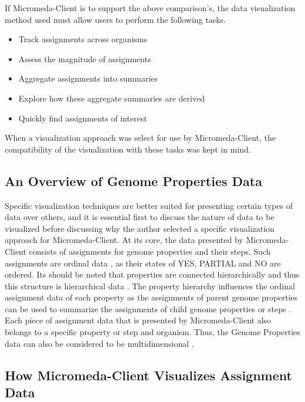 If Micromeda-Client is to support the above comparison's, the data visualization method used must allow users to perform the following tasks.

\begin{itemize}
\item Track assignments across organisms
\item Assess the magnitude of assignments
\item Aggregate assignments into summaries
\item Explore how these aggregate summaries are derived
\item Quickly find assignments of interest
\end{itemize}

When a visualization approach was select for use by Micromeda-Client, the compatibility of the visualization with these tasks was kept in mind.

\subsection{An Overview of Genome Properties Data}

Specific visualization techniques are better suited for presenting certain types of data over others, and it is essential first to discuss the nature of data to be visualized before discussing why the author selected a specific visualization approach for Micromeda-Client. At its core, the data presented by Micromeda-Client consists of assignments for genome properties and their steps. Such assignments are ordinal data \cite{richardson2018genome,agresti2010analysis}, as their states of YES, PARTIAL and NO are ordered. Its should be noted that properties are connected hierarchically \cite{richardson2018genome} and thus this structure is hierarchical data \cite{richardson2018genome,samet1990applications}. The property hierarchy influences the ordinal assignment data of each property as the assignments of parent genome properties can be used to summarize the assignments of child genome properties or steps \cite{richardson2018genome}. Each piece of assignment data that is presented by Micromeda-Client also belongs to a specific property or step and organism. Thus, the Genome Properties data can also be considered to be multidimensional \cite{pedersen1999multidimensional}.

\subsection{How Micromeda-Client Visualizes Assignment Data}

